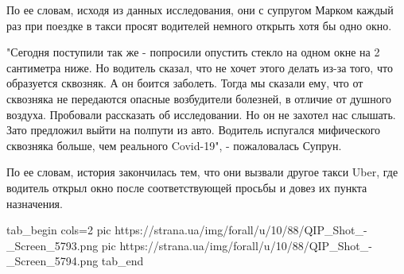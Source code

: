По ее словам, исходя из данных исследования, они с супругом Марком каждый раз
при поездке в такси просят водителей немного открыть хотя бы одно окно.

"Сегодня поступили так же - попросили опустить стекло на одном окне на 2
сантиметра ниже. Но водитель сказал, что не хочет этого делать из-за того, что
образуется сквозняк. А он боится заболеть. Тогда мы сказали ему, что от
сквозняка не передаются опасные возбудители болезней, в отличие от душного
воздуха. Пробовали рассказать об исследовании. Но он не захотел нас слышать.
Зато предложил выйти на полпути из авто. Водитель испугался мифического
сквозняка больше, чем реального Covid-19", - пожаловалась Супрун.

По ее словам, история закончилась тем, что они вызвали другое такси Uber, где
водитель открыл окно после соответствующей просьбы и довез их пункта
назначения.

\ifcmt
tab_begin cols=2
  pic https://strana.ua/img/forall/u/10/88/QIP_Shot_-_Screen_5793.png
	pic https://strana.ua/img/forall/u/10/88/QIP_Shot_-_Screen_5794.png
tab_end
\fi

